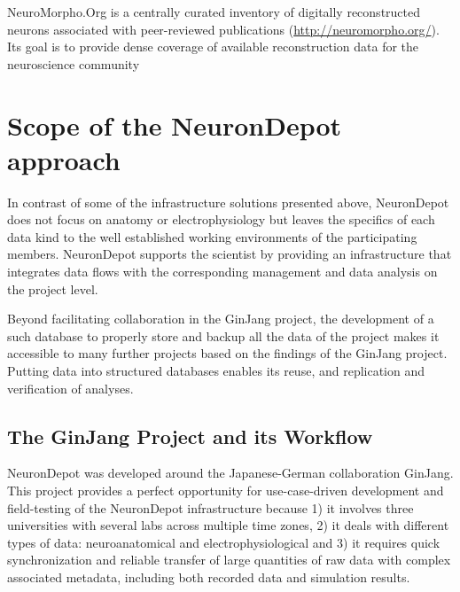 \documentclass{frontiersSCNS} %
\begin{document}
NeuroMorpho.Org is a centrally curated inventory of digitally reconstructed
neurons associated with peer-reviewed publications
(\url{http://neuromorpho.org/}). Its goal is to provide dense coverage of
available reconstruction data for the neuroscience community \citep{Ascoli2007}


\section{Scope of the NeuronDepot approach}

In contrast of some of the infrastructure solutions presented above,
NeuronDepot does
not focus on anatomy or electrophysiology but leaves the specifics of each data
kind to the well established working environments of the participating members.
NeuronDepot supports the scientist by providing an infrastructure that
integrates data flows with the corresponding management and data analysis on
the project level.

Beyond facilitating collaboration in the GinJang project,  the development of a
such database to properly store and backup all the data of the project makes it
accessible to many further projects based on the findings of the GinJang
project. Putting data into structured databases enables its reuse, and
replication and verification of analyses.

\subsection{The GinJang Project and its Workflow}

NeuronDepot was developed around the Japanese-German collaboration GinJang.
This project provides a perfect opportunity for use-case-driven development and
field-testing of the NeuronDepot infrastructure because 1) it involves three
universities with several labs across multiple time zones, 2) it deals with
different types of data: neuroanatomical and electrophysiological and 3) it
requires quick synchronization and reliable transfer of large quantities of raw
data with complex associated metadata, including both recorded data and
simulation results.
\end{document}
